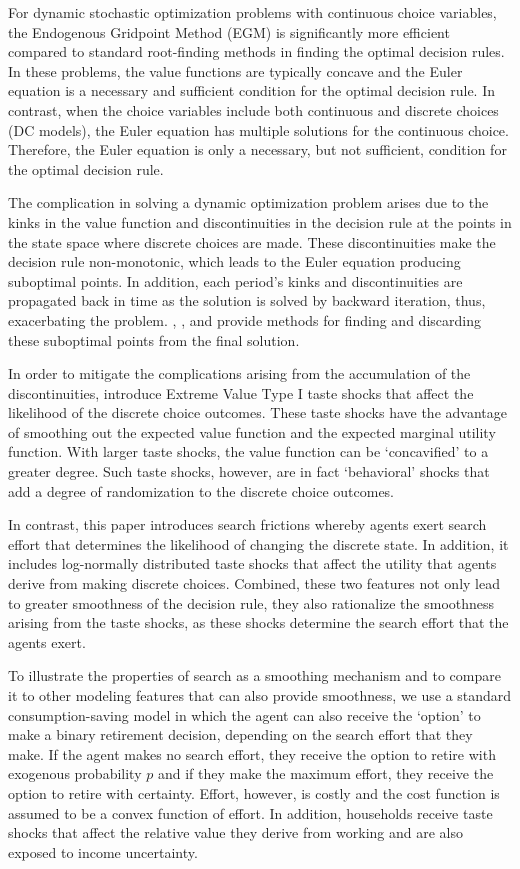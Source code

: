 \documentclass[11pt]{article}
\begin{document}
For dynamic stochastic optimization problems with continuous choice variables, the
Endogenous Gridpoint Method (EGM) is significantly more efficient compared to
standard root-finding methods in finding the optimal decision rules. In these problems,
the value functions are typically concave and the Euler equation is a necessary and
sufficient condition for the optimal decision rule. In contrast, when the choice variables
include both continuous and discrete choices (DC models), the Euler equation has
multiple solutions for the continuous choice. Therefore, the Euler equation is only a
necessary, but not sufficient, condition for the optimal decision rule.

The complication in solving a dynamic optimization problem arises due to the kinks
in the value function and discontinuities in the decision rule at the points in the state
space where discrete choices are made. These discontinuities make the decision rule
non-monotonic, which leads to the Euler equation producing suboptimal points. In
addition, each period's kinks and discontinuities are propagated back in time as the
solution is solved by backward iteration, thus, exacerbating the problem.
\citet{fella2014}, \citet{druedahl2017}, and \citet{ijrs2017}
provide methods for finding and discarding these suboptimal points from the final
solution.

In order to mitigate the complications arising from the accumulation of the
discontinuities, \citet{ijrs2017} introduce Extreme
Value Type I taste shocks that affect the likelihood of the discrete choice outcomes.
These taste shocks have the advantage of smoothing out the expected value function and
the expected marginal utility function. With larger taste shocks, the value function can
be `concavified' to a greater degree. Such taste shocks, however, are in fact `behavioral'
shocks that add a degree of randomization to the discrete choice outcomes.

In contrast, this paper introduces search frictions whereby agents exert search
effort that determines the likelihood of changing the discrete state. In addition, it
includes log-normally distributed taste shocks that affect the utility that agents derive
from making discrete choices. Combined, these two features not only lead to greater
smoothness of the decision rule, they also rationalize the smoothness arising from the
taste shocks, as these shocks determine the search effort that the agents exert.

To illustrate the properties of search as a smoothing mechanism and to compare
it to other modeling features that can also provide smoothness, we use a standard
consumption-saving model in which the agent can also receive the `option' to make a
binary retirement decision, depending on the search effort that they make. If the agent
makes no search effort, they receive the option to retire with exogenous probability $p$
and if they make the maximum effort, they receive the option to retire with certainty.
Effort, however, is costly and the cost function is assumed to be a convex function of
effort. In addition, households receive taste shocks that affect the relative value they
derive from working and are also exposed to income uncertainty.
\end{document}
